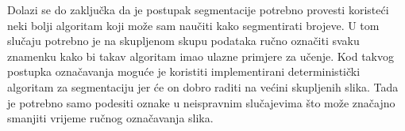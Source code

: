 Dolazi se do zaključka da je postupak segmentacije potrebno provesti koristeći neki bolji algoritam koji može sam
naučiti kako segmentirati brojeve. U tom slučaju potrebno je na skupljenom skupu podataka ručno označiti svaku znamenku
kako bi takav algoritam imao ulazne primjere za učenje. Kod takvog postupka označavanja moguće je koristiti
implementirani deterministički algoritam za segmentaciju jer će on dobro raditi na većini skupljenih slika. Tada je
potrebno samo podesiti oznake u neispravnim slučajevima što može značajno smanjiti vrijeme ručnog označavanja slika.

